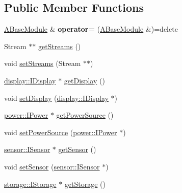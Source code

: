\subsection*{Public Member Functions}
\begin{DoxyCompactItemize}
\item 
\mbox{\label{classathome_1_1module_1_1_a_base_module_ac1444e438bcfcc06f6593e3d4d5fb1fe}} 
\mbox{\hyperlink{classathome_1_1module_1_1_a_base_module}{A\+Base\+Module}} \& {\bfseries operator=} (\mbox{\hyperlink{classathome_1_1module_1_1_a_base_module}{A\+Base\+Module}} \&)=delete
\item 
Stream $\ast$$\ast$ \mbox{\hyperlink{classathome_1_1module_1_1_a_base_module_adc612512d2acb7bc3f3d533bcc1aa41b}{get\+Streams}} ()
\item 
void \mbox{\hyperlink{classathome_1_1module_1_1_a_base_module_af1af8e6110a8d0baee15efb2275ae5ae}{set\+Streams}} (Stream $\ast$$\ast$)
\item 
\mbox{\hyperlink{classathome_1_1display_1_1_i_display}{display\+::\+I\+Display}} $\ast$ \mbox{\hyperlink{classathome_1_1module_1_1_a_base_module_ada20b6ad1e6f750d2886f1e7b10cca70}{get\+Display}} ()
\item 
void \mbox{\hyperlink{classathome_1_1module_1_1_a_base_module_a451a1fb99905c7d21f3a818ee39acc69}{set\+Display}} (\mbox{\hyperlink{classathome_1_1display_1_1_i_display}{display\+::\+I\+Display}} $\ast$)
\item 
\mbox{\hyperlink{classathome_1_1power_1_1_i_power}{power\+::\+I\+Power}} $\ast$ \mbox{\hyperlink{classathome_1_1module_1_1_a_base_module_a3152f721f953e32a1f965856936d188e}{get\+Power\+Source}} ()
\item 
void \mbox{\hyperlink{classathome_1_1module_1_1_a_base_module_a0c217f9a8d052efc5490bc9145fdf7f9}{set\+Power\+Source}} (\mbox{\hyperlink{classathome_1_1power_1_1_i_power}{power\+::\+I\+Power}} $\ast$)
\item 
\mbox{\hyperlink{classathome_1_1sensor_1_1_i_sensor}{sensor\+::\+I\+Sensor}} $\ast$ \mbox{\hyperlink{classathome_1_1module_1_1_a_base_module_abd4cf0d059639c4d09f35d7b1ddd2b4e}{get\+Sensor}} ()
\item 
void \mbox{\hyperlink{classathome_1_1module_1_1_a_base_module_a071b5d07dc3497908520a5b0dc9404ef}{set\+Sensor}} (\mbox{\hyperlink{classathome_1_1sensor_1_1_i_sensor}{sensor\+::\+I\+Sensor}} $\ast$)
\item 
\mbox{\hyperlink{classathome_1_1storage_1_1_i_storage}{storage\+::\+I\+Storage}} $\ast$ \mbox{\hyperlink{classathome_1_1module_1_1_a_base_module_accc6c7f840dab1b1e67fe910c833f0b7}{get\+Storage}} ()

\end{DoxyCompactItemize}
